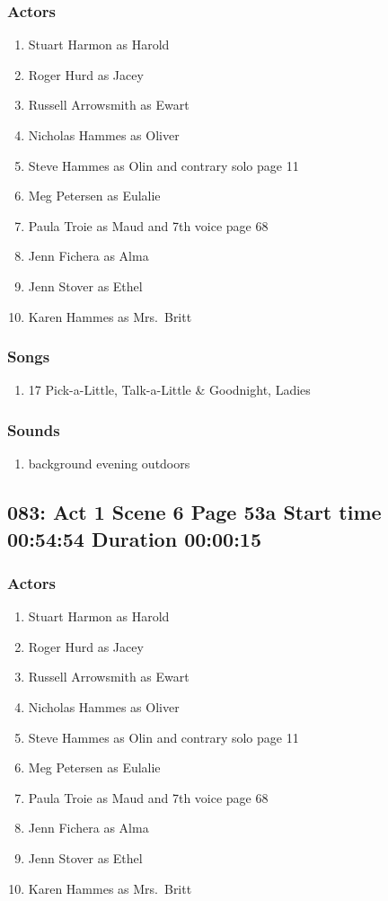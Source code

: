 \subsubsection{Actors}
\begin{enumerate}
\item Stuart Harmon as Harold
\item Roger Hurd as Jacey
\item Russell Arrowsmith as Ewart
\item Nicholas Hammes as Oliver
\item Steve Hammes as Olin and contrary solo page 11
\item Meg Petersen as Eulalie
\item Paula Troie as Maud and 7th voice page 68
\item Jenn Fichera as Alma
\item Jenn Stover as Ethel
\item Karen Hammes as Mrs.~Britt
\end{enumerate}

\subsubsection{Songs}
\begin{enumerate}
\item 17 Pick-a-Little, Talk-a-Little \& Goodnight, Ladies
\end{enumerate}\subsubsection{Sounds}
\begin{enumerate}
\item background evening outdoors
\end{enumerate}
\subsection{083: Act 1 Scene 6 Page 53a Start time 00:54:54 Duration 00:00:15}

\subsubsection{Actors}
\begin{enumerate}
\item Stuart Harmon as Harold
\item Roger Hurd as Jacey
\item Russell Arrowsmith as Ewart
\item Nicholas Hammes as Oliver
\item Steve Hammes as Olin and contrary solo page 11
\item Meg Petersen as Eulalie
\item Paula Troie as Maud and 7th voice page 68
\item Jenn Fichera as Alma
\item Jenn Stover as Ethel
\item Karen Hammes as Mrs.~Britt
\end{enumerate}

